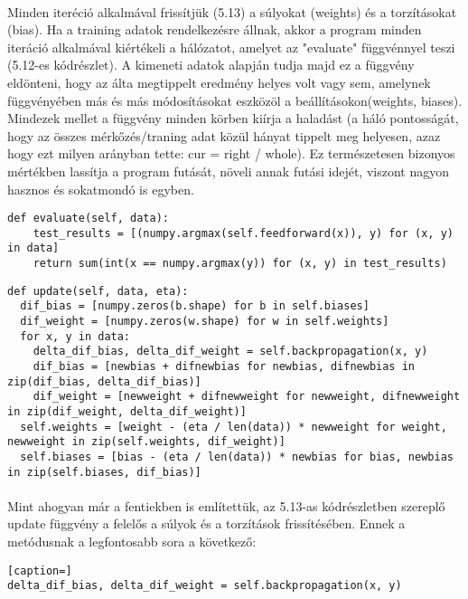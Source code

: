 \paragraph{}
Minden iteréció alkalmával frissítjük (5.13) a súlyokat (weights) és a torzításokat (bias). Ha a training adatok rendelkezésre állnak, akkor a program minden iteráció alkalmával kiértékeli a hálózatot, amelyet az "evaluate" függvénnyel teszi (5.12-es kódrészlet). A kimeneti adatok alapján tudja majd ez a függvény eldönteni, hogy az álta megtippelt eredmény helyes volt vagy sem, amelynek függvényében más és más módosításokat eszközöl a beállításokon(weights, biases). Mindezek mellet a függvény minden körben kiírja a haladást (a háló pontosságát, hogy az összes mérkőzés/traning adat közül hányat tippelt meg helyesen, azaz hogy ezt milyen arányban tette: cur = right / whole). Ez természetesen bizonyos mértékben lassítja a program futását, növeli annak futási idejét, viszont nagyon hasznos és sokatmondó is egyben.

\begin{lstlisting}[caption= A neurális hálót kiértékelő függvény]
def evaluate(self, data):
    test_results = [(numpy.argmax(self.feedforward(x)), y) for (x, y) in data]
    return sum(int(x == numpy.argmax(y)) for (x, y) in test_results)
\end{lstlisting}

\begin{lstlisting}[caption= A neurális hálót kiértékelő függvény]
def update(self, data, eta):
  dif_bias = [numpy.zeros(b.shape) for b in self.biases]
  dif_weight = [numpy.zeros(w.shape) for w in self.weights]
  for x, y in data:
    delta_dif_bias, delta_dif_weight = self.backpropagation(x, y)
    dif_bias = [newbias + difnewbias for newbias, difnewbias in zip(dif_bias, delta_dif_bias)]
    dif_weight = [newweight + difnewweight for newweight, difnewweight in zip(dif_weight, delta_dif_weight)]
  self.weights = [weight - (eta / len(data)) * newweight for weight, newweight in zip(self.weights, dif_weight)]
  self.biases = [bias - (eta / len(data)) * newbias for bias, newbias in zip(self.biases, dif_bias)]
\end{lstlisting}

\paragraph{}
Mint ahogyan már a fentiekben is említettük, az 5.13-as kódrészletben szereplő update függvény a felelős a súlyok és a torzítások frissítésében. Ennek a metódusnak a legfontosabb sora a következő: \\
\begin{lstlisting}[caption=]
delta_dif_bias, delta_dif_weight = self.backpropagation(x, y)
\end{lstlisting}
